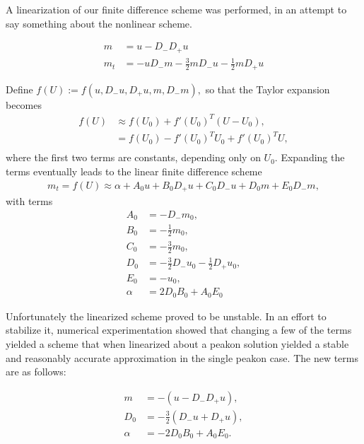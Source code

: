 A linearization of our finite difference scheme was performed, in an attempt to say something about the nonlinear scheme. 

\begin{align*}
m &= u - D_{-} D_{+} u \\
m_{t} &= -uD_{-}m - \frac{3}{2}mD_{-}u - \frac{1}{2}mD_{+}u
\end{align*} 

Define $f(U) := f(u, D_{-}u, D_{+}u, m, D_{-}m),$ so that the Taylor expansion becomes
\begin{align*}
f(U) &\approx f(U_{0}) + f'(U_{0})^{T}(U-U_{0}),\\
&= f(U_{0}) - f'(U_{0})^{T}U_{0} + f'(U_{0})^{T}U, \\
\end{align*}
where the first two terms are constants, depending only on  $U_{0}$. Expanding the terms eventually leads to the linear finite difference scheme
\begin{align*}
m_{t} = f(U) \approx \alpha + A_{0}u + B_{0}D_{+}u + C_{0}D_{-}u + D_{0}m + E_{0}D_{-}m,
\end{align*}
with terms
\begin{align*}
A_{0} &= -D_{-}m_{0}, \\
B_{0} &= - \frac{1}{2}m_{0}, \\
C_{0} &= - \frac{3}{2}m_{0}, \\
D_{0} &= - \frac{3}{2}D_{-}u_{0} - \frac{1}{2}D_{+}u_{0}, \\
E_{0} &= - u_{0}, \\
\alpha &= 2 D_0 B_0 + A_0 E_0
\end{align*}

Unfortunately the linearized scheme proved to be unstable. In an effort to stabilize it, numerical experimentation showed that changing a few of the terms yielded a scheme that when linearized about a peakon solution yielded a stable and reasonably accurate approximation in the single peakon case. The new terms are as follows:

\begin{align*}
m &= -(u - D_{-}D_{+}u), \\
D_{0} &= -\frac{3}{2}(D_{-}u + D_{+}u), \\
\alpha &= -2D_{0}B_{0} + A_{0}E_{0}.
\end{align*}